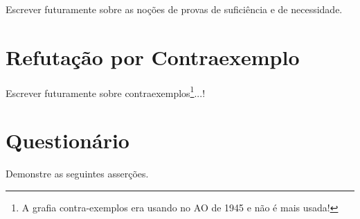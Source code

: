 Escrever futuramente sobre as noções de provas de suficiência e de necessidade.

\section{Refutação por Contraexemplo}

Escrever futuramente sobre contraexemplos\footnote{A grafia contra-exemplos era usando no AO de 1945 e não é mais usada!}...!

\section{Questionário}\label{sec:Questionario2part1}

\begin{problem}\label{prob:Demosntracoes1}
	Demonstre as seguintes asserções.
\end{problem}

